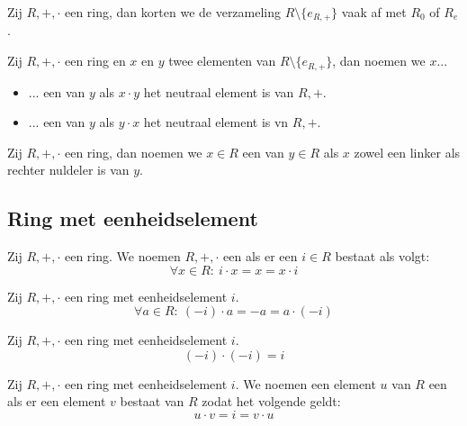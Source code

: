 \documentclass[main.tex]{subfiles}
\begin{document}
\begin{de}
  Zij $R,+,\cdot$ een ring, dan korten we de verzameling $R\setminus \{e_{R,+}\}$ vaak af met $R_{0}$ of $R_{e}$.
\end{de}

\begin{de}
  Zij $R,+,\cdot$ een ring en $x$ en $y$ twee elementen van $R\setminus \{e_{R,+}\}$, dan noemen we $x$...
  \begin{itemize}
  \item ... een  van $y$ als $x\cdot y$ het neutraal element is van $R,+$.
  \item ... een  van $y$ als $y\cdot x$ het neutraal element is vn $R,+$.
  \end{itemize}
\end{de}

\begin{de}
  Zij $R,+,\cdot$ een ring, dan noemen we $x\in R$ een  van $y\in R$ als $x$ zowel een linker als rechter nuldeler is van $y$.
\end{de}

\subsection{Ring met eenheidselement}
\label{sec:ring-met-eenheidselement}

\begin{de}
  Zij $R,+,\cdot$ een ring.
  We noemen $R,+,\cdot$ een  als er een  $i\in R$ bestaat als volgt:
  \[ \forall x\in R:\ i\cdot x = x = x \cdot i \]
\end{de}

\begin{ei}
  Zij $R,+,\cdot$ een ring met eenheidselement $i$.
  \[ \forall a \in R:\ (-i)\cdot a = -a = a \cdot (-i) \]
\end{ei}

\begin{ei}
  Zij $R,+,\cdot$ een ring met eenheidselement $i$.
  \[ (-i) \cdot (-i) = i\]
\end{ei}

\begin{de}
  Zij $R,+,\cdot$ een ring met eenheidselement $i$.
  We noemen een element $u$ van $R$ een  als er een element $v$ bestaat van $R$ zodat het volgende geldt:
  \[ u \cdot v = i = v \cdot u \]
\end{de}
\end{document}
